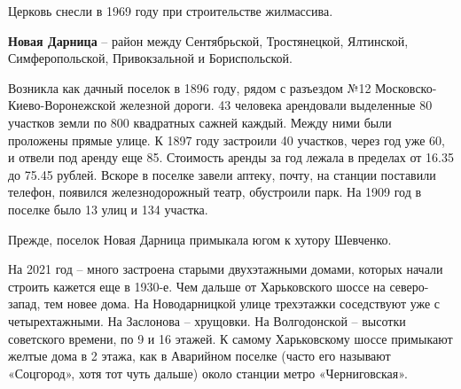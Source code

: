 Церковь снесли в 1969 году при строительстве жилмассива.\\ 

\medskip


\textbf{Новая Дарница} – район между Сентябрьской, Тростянецкой, Ялтинской, Симферопольской, Привокзальной и Бориспольской. 

Возникла как дачный поселок в 1896 году, рядом с разъездом №12 Московско-Киево-Воронежской железной дороги. 43 человека арендовали выделенные 80 участков земли по 800 квадратных сажней каждый. Между ними были проложены прямые улице. К 1897 году застроили 40 участков, через год уже 60, и отвели под аренду еще 85. Стоимость аренды за год лежала в пределах от 16.35 до 75.45 рублей. Вскоре в поселке завели аптеку, почту, на станции поставили телефон, появился железнодорожный театр, обустроили парк. На 1909 год в поселке было 13 улиц и 134 участка.

Прежде, поселок Новая Дарница примыкала югом к хутору Шевченко. 

На 2021 год – много застроена старыми двухэтажными домами, которых начали строить кажется еще в 1930-е. Чем дальше от Харьковского шоссе на северо-запад, тем новее дома. На Новодарницкой улице трехэтажки соседствуют уже с четырехтажными. На Заслонова – хрущовки. На Волгодонской – высотки советского времени, по 9 и 16 этажей. К самому Харьковскому шоссе примыкают желтые дома в 2 этажа, как в Аварийном поселке (часто его называют «Соцгород», хотя тот чуть дальше) около станции метро «Черниговская».
